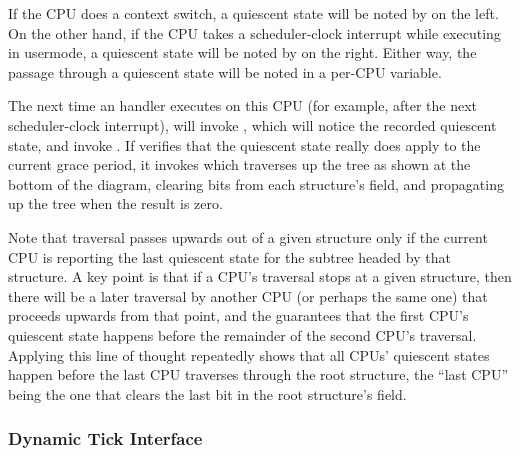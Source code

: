 \QuickQuizEnd

If the CPU does a context switch, a quiescent state will be noted by
 on the left.
On the other hand, if the CPU
takes a scheduler-clock interrupt while executing in usermode, a
quiescent state will be noted by  on the right.
Either way, the passage through a quiescent state will be noted in a
per-CPU variable.

The next time an  handler executes on this CPU (for
example, after the next scheduler-clock interrupt),  will
invoke , which will notice the recorded
quiescent state, and invoke .
If
 verifies that the quiescent state really does
apply to the current grace period, it invokes  which
traverses up the  tree as shown at the bottom of the
diagram, clearing bits from each  structure's 
field, and propagating up the tree when the result is zero.

Note that traversal passes upwards out of a given  structure
only if the current CPU is reporting the last quiescent state for the
subtree headed by that  structure.
A key point is that if a
CPU's traversal stops at a given  structure, then there will
be a later traversal by another CPU (or perhaps the same one) that
proceeds upwards from that point, and the  
guarantees that the first CPU's quiescent state happens before the
remainder of the second CPU's traversal.
Applying this line of thought
repeatedly shows that all CPUs' quiescent states happen before the last
CPU traverses through the root  structure, the ``last CPU''
being the one that clears the last bit in the root 
structure's  field.

\subsubsection{Dynamic Tick Interface}
\label{sec:rcu:memorder:Dynamic Tick Interface}

